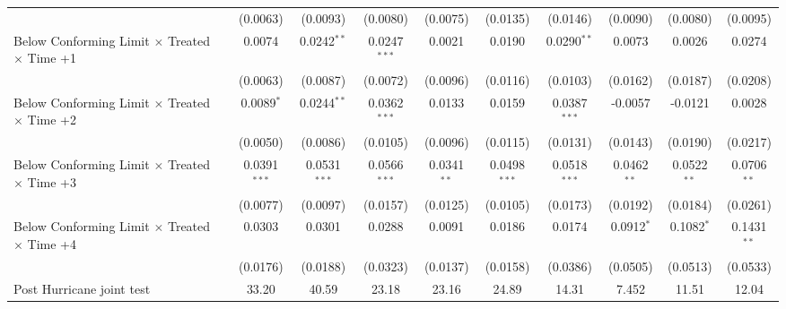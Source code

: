 \begin{tabular}{lccccccccc}
                                                              & (0.0063)       & (0.0093)       & (0.0080)       & (0.0075)      & (0.0135)       & (0.0146)              & (0.0090)      & (0.0080)              & (0.0095)\\   
   Below Conforming Limit $\times$ Treated $\times$ Time +1   & 0.0074         & 0.0242$^{**}$  & 0.0247$^{***}$ & 0.0021        & 0.0190         & 0.0290$^{**}$         & 0.0073        & 0.0026                & 0.0274\\   
                                                              & (0.0063)       & (0.0087)       & (0.0072)       & (0.0096)      & (0.0116)       & (0.0103)              & (0.0162)      & (0.0187)              & (0.0208)\\   
   Below Conforming Limit $\times$ Treated $\times$ Time +2   & 0.0089$^{*}$   & 0.0244$^{**}$  & 0.0362$^{***}$ & 0.0133        & 0.0159         & 0.0387$^{***}$        & -0.0057       & -0.0121               & 0.0028\\   
                                                              & (0.0050)       & (0.0086)       & (0.0105)       & (0.0096)      & (0.0115)       & (0.0131)              & (0.0143)      & (0.0190)              & (0.0217)\\   
   Below Conforming Limit $\times$ Treated $\times$ Time +3   & 0.0391$^{***}$ & 0.0531$^{***}$ & 0.0566$^{***}$ & 0.0341$^{**}$ & 0.0498$^{***}$ & 0.0518$^{***}$        & 0.0462$^{**}$ & 0.0522$^{**}$         & 0.0706$^{**}$\\   
                                                              & (0.0077)       & (0.0097)       & (0.0157)       & (0.0125)      & (0.0105)       & (0.0173)              & (0.0192)      & (0.0184)              & (0.0261)\\   
   Below Conforming Limit $\times$ Treated $\times$ Time +4   & 0.0303         & 0.0301         & 0.0288         & 0.0091        & 0.0186         & 0.0174                & 0.0912$^{*}$  & 0.1082$^{*}$          & 0.1431$^{**}$\\   
                                                              & (0.0176)       & (0.0188)       & (0.0323)       & (0.0137)      & (0.0158)       & (0.0386)              & (0.0505)      & (0.0513)              & (0.0533)\\   
   Post Hurricane joint test                                  & 33.20          & 40.59          & 23.18          & 23.16         & 24.89          & 14.31                 & 7.452         & 11.51                 & 12.04\\  

\end{tabular}
